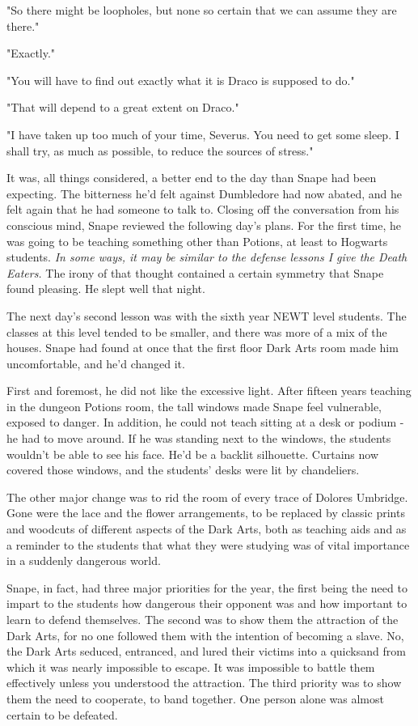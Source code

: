 \documentclass[a4paper,11pt]{article}
\begin{document}
"So there might be loopholes, but none so certain that we can assume they are there."

"Exactly."

"You will have to find out exactly what it is Draco is supposed to do."

"That will depend to a great extent on Draco."

"I have taken up too much of your time, Severus. You need to get some sleep. I shall try, as much as possible, to reduce the sources of stress."

It was, all things considered, a better end to the day than Snape had been expecting. The bitterness he'd felt against Dumbledore had now abated, and he felt again that he had someone to talk to. Closing off the conversation from his conscious mind, Snape reviewed the following day's plans. For the first time, he was going to be teaching something other than Potions, at least to Hogwarts students. \emph{In some ways, it may be similar to the defense lessons I give the Death Eaters.} The irony of that thought contained a certain symmetry that Snape found pleasing. He slept well that night.

The next day's second lesson was with the sixth year NEWT level students. The classes at this level tended to be smaller, and there was more of a mix of the houses. Snape had found at once that the first floor Dark Arts room made him uncomfortable, and he'd changed it.

First and foremost, he did not like the excessive light. After fifteen years teaching in the dungeon Potions room, the tall windows made Snape feel vulnerable, exposed to danger. In addition, he could not teach sitting at a desk or podium - he had to move around. If he was standing next to the windows, the students wouldn't be able to see his face. He'd be a backlit silhouette. Curtains now covered those windows, and the students' desks were lit by chandeliers.

The other major change was to rid the room of every trace of Dolores Umbridge. Gone were the lace and the flower arrangements, to be replaced by classic prints and woodcuts of different aspects of the Dark Arts, both as teaching aids and as a reminder to the students that what they were studying was of vital importance in a suddenly dangerous world.

Snape, in fact, had three major priorities for the year, the first being the need to impart to the students how dangerous their opponent was and how important to learn to defend themselves. The second was to show them the attraction of the Dark Arts, for no one followed them with the intention of becoming a slave. No, the Dark Arts seduced, entranced, and lured their victims into a quicksand from which it was nearly impossible to escape. It was impossible to battle them effectively unless you understood the attraction. The third priority was to show them the need to cooperate, to band together. One person alone was almost certain to be defeated.
\end{document}
